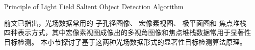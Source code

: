 %
%
%
%
%
%
%
%
%
%
%
%
%
%
%
%
%
%










{Principle of Light Field Salient Object Detection Algorithm}

%
%
%
%
%
%
前文已指出，光场数据常用的
子孔径图像、
宏像素视图、
极平面图和
焦点堆栈
四种表示方式，其中宏像素视图成像出的多视角图像和焦点堆栈数据常用于显著性目标检测。
本小节探讨了基于这两种光场数据形式的显著性目标检测算法原理。



%
%






